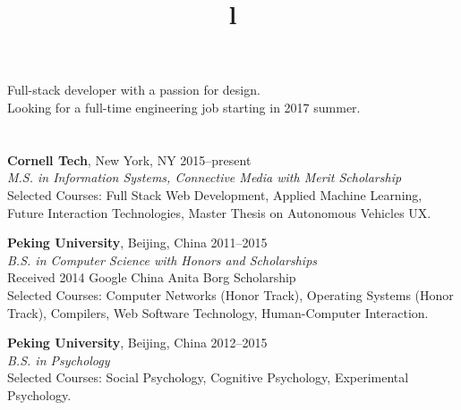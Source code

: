 \begin{resume}

\vspace{25pt}

\section{}

Full-stack developer with a passion for design. \\
Looking for a full-time engineering job starting in 2017 summer.

\section{}

\textbf{Cornell Tech}, New York, NY \hfill 2015--present \\
\textsl{M.S. in Information Systems, Connective Media with Merit Scholarship} \\
Selected Courses: Full Stack Web Development, Applied Machine Learning, Future Interaction
Technologies, Master Thesis on Autonomous Vehicles UX.

\textbf{Peking University}, Beijing, China \hfill 2011--2015 \\ 
\textsl{B.S. in Computer Science with Honors and Scholarships}\\
Received 2014 Google China Anita Borg Scholarship \\
Selected Courses: Computer Networks (Honor Track), Operating Systems (Honor Track), Compilers, Web Software Technology, Human-Computer Interaction.

\textbf{Peking University}, Beijing, China \hfill 2012--2015 \\ 
\textsl{B.S. in Psychology}\\
Selected Courses: Social Psychology, Cognitive Psychology, Experimental Psychology.

\begin{formatb}
  \\
  \title{l}\\
  \body\\
\end{formatb}


\section{}


\end{resume}
